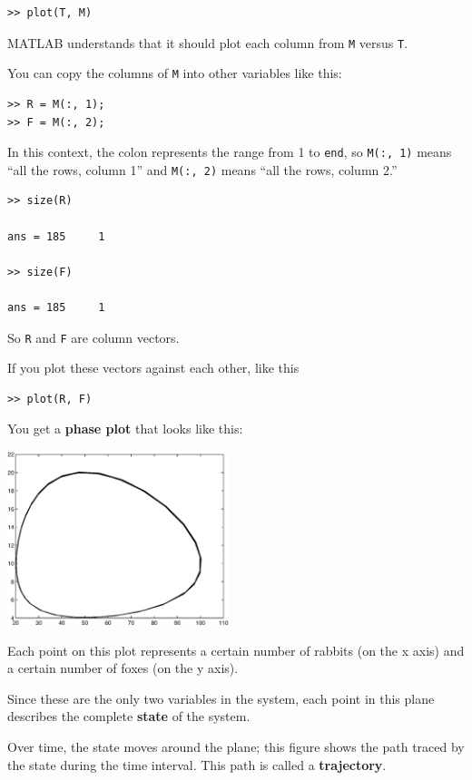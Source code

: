 \documentclass[
]{book}
\begin{document}
\begin{verbatim}
>> plot(T, M)
\end{verbatim}

MATLAB understands that it should plot each column from {\tt M}
versus {\tt T}.

You can copy the columns of {\tt M} into other variables like
this:

\begin{verbatim}
>> R = M(:, 1);
>> F = M(:, 2);
\end{verbatim}

In this context, the colon represents the range from 1 to {\tt end},
so {\tt M(:, 1)} means ``all the rows, column 1'' and
{\tt M(:, 2)} means ``all the rows, column 2.''

\begin{verbatim}
>> size(R)

ans = 185     1

>> size(F)

ans = 185     1
\end{verbatim}

So {\tt R} and {\tt F} are column vectors.


If you plot these
vectors against each other, like this

\begin{verbatim}
>> plot(R, F)
\end{verbatim}

You get a {\bf phase plot} that looks like this:

\beforefig \centerline{\includegraphics[height=2in]{figs/phase.eps}}

Each point on this plot represents a certain number of rabbits (on the
x axis) and a certain number of foxes (on the y axis).

Since these are the only two variables in the system, each point in
this plane describes the complete {\bf state} of the system.

Over time, the state moves around the plane; this figure shows
the path traced by the state during the time interval.  This path
is called a {\bf trajectory}.
\end{document}
